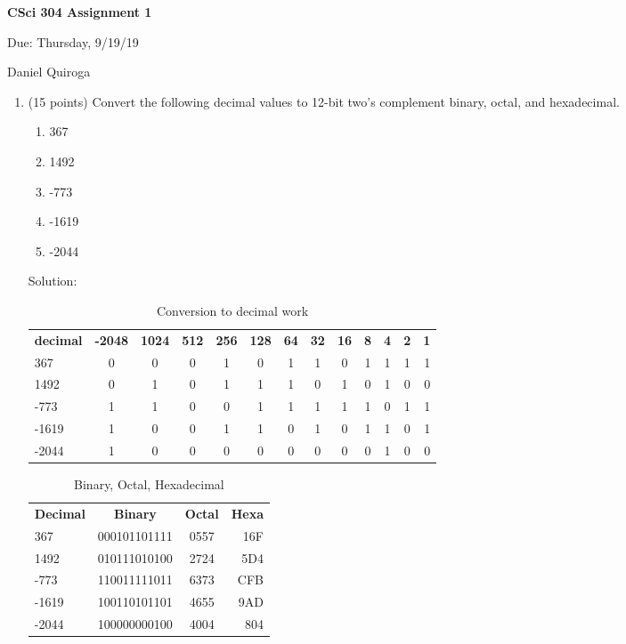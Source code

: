 \documentclass[11pt]{article}
\begin{document}
\begin{LARGE}
\centerline {\bf CSci 304 Assignment 1}
\end{LARGE}
\vskip 0.25cm

\centerline{Due: Thursday, 9/19/19}
\centerline{Daniel Quiroga}

\begin{enumerate}

\item (15 points) Convert the following decimal values to 12-bit two's complement binary, octal, and hexadecimal.
\begin{enumerate}
    \item 367
    \item 1492
    \item -773
    \item -1619
    \item -2044
\end{enumerate}{}

Solution:

\begin{table}[h!]
 \begin{center}
   \caption{Conversion to decimal work}
   	\begin{tabular}{l|c|c|c|c|c|c|c|c|c|c|c|r}
   	\textbf{decimal} & \textbf{-2048} & \textbf{1024} & \textbf{512} & \textbf{256} & \textbf{128} & \textbf{64} & \textbf{32} & \textbf{16} & \textbf{8} & \textbf{4} & \textbf{2} &\textbf{1}\\
   	
   	  367 & 0 & 0 & 0 & 1 & 0 &  1 & 1 & 0 & 1 & 1 & 1 & 1\\
      1492 & 0 & 1 & 0 & 1 & 1 & 1 & 0 & 1 & 0 & 1 & 0 & 0\\
      -773 & 1 & 1 & 0 & 0 & 1 & 1 & 1 & 1 & 1 & 0 & 1 & 1\\
      -1619 & 1 & 0 & 0 & 1 & 1 & 0 & 1 & 0 & 1 & 1 & 0 & 1\\
      -2044 & 1 & 0 & 0 & 0 & 0 & 0 & 0 & 0 & 0 & 1 & 0 & 0\\
   	
   	\end{tabular}
 \end{center}
\end{table}

\begin{table}[h!]
  \begin{center}
    \caption{Binary, Octal, Hexadecimal}
    \label{tab:Table 1}
    \begin{tabular}{l|c|c|r} %
      \textbf{Decimal} & \textbf{Binary} & \textbf{Octal} &\textbf{Hexa}\\
      367 & 000101101111 & 0557 & 16F\\
      1492 & 010111010100 & 2724 & 5D4 \\
      -773 & 110011111011 & 6373 & CFB\\ %
      -1619 & 100110101101 & 4655 & 9AD\\
      -2044 & 100000000100 & 4004 & 804\\ 
      

\end{tabular}
\end{center}
\end{table}
\end{enumerate}
\end{document}

